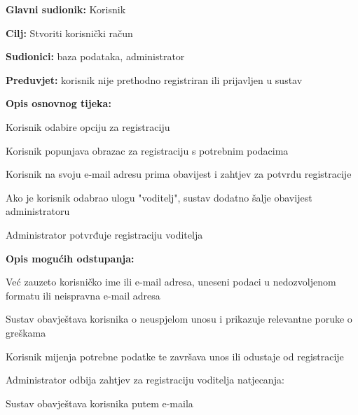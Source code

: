 					\noindent {}
					\begin{packed_item}
						
						\item \textbf{Glavni sudionik: }Korisnik
						\item  \textbf{Cilj:} Stvoriti korisnički račun
						\item  \textbf{Sudionici:} baza podataka, administrator 
						\item  \textbf{Preduvjet:} korisnik nije prethodno registriran ili prijavljen u sustav
						\item  \textbf{Opis osnovnog tijeka:}
						
						\item[] \begin{packed_enum}
							
							\item Korisnik odabire opciju za registraciju 
							\item Korisnik popunjava obrazac za registraciju s potrebnim podacima 
							\item Korisnik na svoju e-mail adresu prima obavijest i zahtjev za potvrdu registracije
							\item Ako je korisnik odabrao ulogu "voditelj", sustav dodatno šalje obavijest administratoru 
							\item Administrator potvrđuje registraciju voditelja 
						\end{packed_enum}
						
						\item  \textbf{Opis mogućih odstupanja:}
						\item[] \begin{packed_item}
							
							\item[2.a] Već zauzeto korisničko ime ili e-mail adresa, uneseni podaci u nedozvoljenom formatu ili neispravna e-mail adresa 
							\item[] \begin{packed_enum}
								
								\item Sustav obavještava korisnika o neuspjelom unosu i prikazuje relevantne poruke o greškama 
								\item Korisnik mijenja potrebne podatke te završava unos ili odustaje od registracije 
								
							\end{packed_enum}
							
							\item[5.a] Administrator odbija zahtjev za registraciju voditelja natjecanja:
							\item[] \begin{packed_enum}
								
								\item Sustav obavještava korisnika putem e-maila
								
							\end{packed_enum}
						\end{packed_item}
					\end{packed_item}
					
